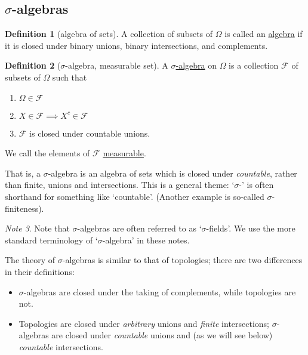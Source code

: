 \documentclass[a4paper,12pt]{scrreprt}
\newcommand{\defn}[1]{\ul{#1}}
\theoremstyle{definition}
\newtheorem{definition}{Definition}
\theoremstyle{plain}
\theoremstyle{remark}
\newtheorem{note}[definition]{Note}
\begin{document}
\subsection{\texorpdfstring{$\sigma$}{Lg}-algebras}
\begin{definition}[algebra of sets]
  \label{def:algebraofsets}
  A collection of subsets of $\Omega$ is called an \defn{algebra} if it is closed under binary unions, binary intersections, and complements.
\end{definition}

\begin{definition}[$\sigma$-algebra, measurable set]
  \label{def:sigmaalgebra}
  A \defn{$\sigma$-algebra} on $\Omega$ is a collection $\mathcal{F}$ of subsets of $\Omega$ such that
  \begin{enumerate}
    \item $\Omega \in \mathcal{F}$
    \item $X \in \mathcal{F} \implies X^{c} \in \mathcal{F}$
    \item $\mathcal{F}$ is closed under countable unions.
  \end{enumerate}

  We call the elements of $\mathcal{F}$ \defn{measurable}.
\end{definition}

That is, a $\sigma$-algebra is an algebra of sets which is closed under \emph{countable}, rather than finite, unions and intersections. This is a general theme: `$\sigma$-' is often shorthand for something like `countable'. (Another example is so-called $\sigma$-finiteness).

\begin{note}
  Note that $\sigma$-algebras are often referred to as `$\sigma$-fields'. We use the more standard terminology of `$\sigma$-algebra' in these notes.
\end{note}

The theory of $\sigma$-algebras is similar to that of topologies; there are two differences in their definitions:
\begin{itemize}
  \item $\sigma$-algebras are closed under the taking of complements, while topologies are not.

  \item Topologies are closed under \emph{arbitrary} unions and \emph{finite} intersections; $\sigma$-algebras are closed under \emph{countable} unions and (as we will see below) \emph{countable} intersections.
\end{itemize}
\end{document}
